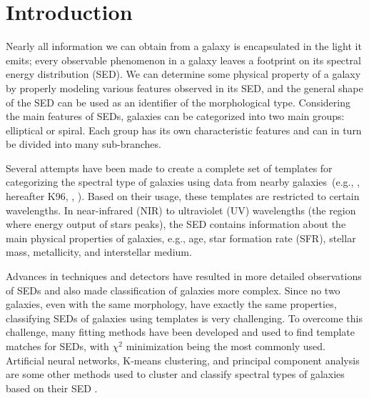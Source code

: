 \section{Introduction}
\label{sec: intro}
Nearly all information we can obtain from a galaxy is encapsulated in the light it emits; every observable phenomenon in a galaxy leaves a footprint on its spectral energy distribution (SED).
We can determine some physical property of a galaxy by properly modeling various features observed in its SED, and the general shape of the SED can be used as an identifier of the morphological type.
Considering the main features of SEDs, galaxies can be categorized into two main groups: elliptical or spiral.
Each group has its own characteristic features and can in turn be divided into many sub-branches.

Several attempts have been made to create a complete set of templates for categorizing the spectral type of galaxies using data from nearby galaxies~(e.g.\citealt{Kinney93}, \citealt{Kinney96}, hereafter K96, \citealt{Bershady00}, \citealt{Mannucci01}). 
Based on their usage, these templates are restricted to certain wavelengths.
In near-infrared (NIR) to ultraviolet (UV) wavelengths (the region where energy output of stars peaks), the SED contains information about the main physical properties of galaxies, e.g., age, star formation rate (SFR), stellar mass, metallicity, and interstellar medium.



Advances in techniques and detectors have resulted in more detailed observations of SEDs and also made classification of galaxies more complex.
Since no two galaxies, even with the same morphology, have exactly the same properties, classifying SEDs of galaxies using templates is very challenging.
To overcome this challenge, many fitting methods have been developed and used to find template matches for SEDs, with $\chi^2$ minimization being the most commonly used. 
Artificial neural networks, K-means clustering, and principal component analysis are some other methods used to cluster and classify spectral types of galaxies based on their SED \citep[e.g.][]{Allen13,Ordov14,Shi15}.

